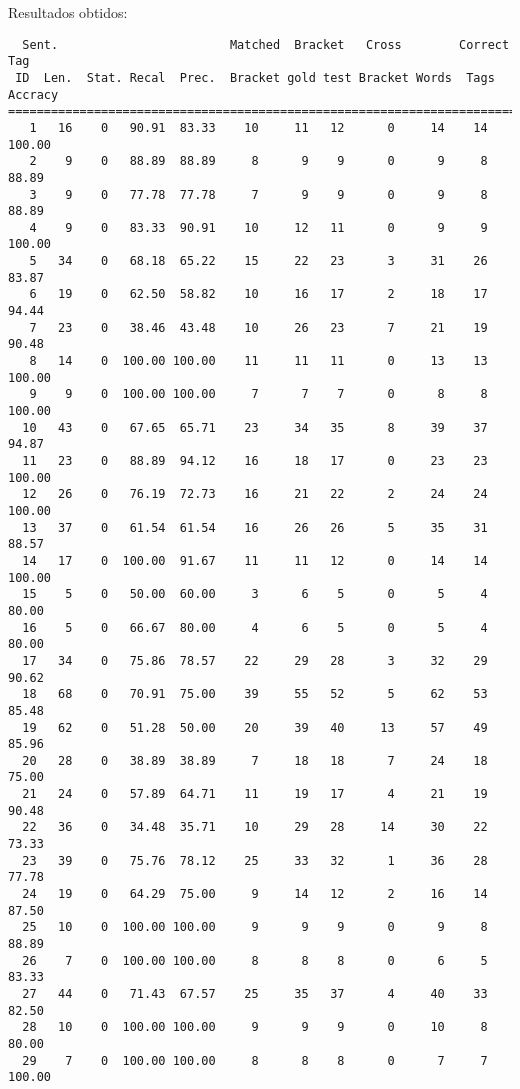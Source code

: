 \normalsize

Resultados obtidos:

\scriptsize
\begin{verbatim}
  Sent.                        Matched  Bracket   Cross        Correct Tag
 ID  Len.  Stat. Recal  Prec.  Bracket gold test Bracket Words  Tags Accracy
============================================================================
   1   16    0   90.91  83.33    10     11   12      0     14    14   100.00
   2    9    0   88.89  88.89     8      9    9      0      9     8    88.89
   3    9    0   77.78  77.78     7      9    9      0      9     8    88.89
   4    9    0   83.33  90.91    10     12   11      0      9     9   100.00
   5   34    0   68.18  65.22    15     22   23      3     31    26    83.87
   6   19    0   62.50  58.82    10     16   17      2     18    17    94.44
   7   23    0   38.46  43.48    10     26   23      7     21    19    90.48
   8   14    0  100.00 100.00    11     11   11      0     13    13   100.00
   9    9    0  100.00 100.00     7      7    7      0      8     8   100.00
  10   43    0   67.65  65.71    23     34   35      8     39    37    94.87
  11   23    0   88.89  94.12    16     18   17      0     23    23   100.00
  12   26    0   76.19  72.73    16     21   22      2     24    24   100.00
  13   37    0   61.54  61.54    16     26   26      5     35    31    88.57
  14   17    0  100.00  91.67    11     11   12      0     14    14   100.00
  15    5    0   50.00  60.00     3      6    5      0      5     4    80.00
  16    5    0   66.67  80.00     4      6    5      0      5     4    80.00
  17   34    0   75.86  78.57    22     29   28      3     32    29    90.62
  18   68    0   70.91  75.00    39     55   52      5     62    53    85.48
  19   62    0   51.28  50.00    20     39   40     13     57    49    85.96
  20   28    0   38.89  38.89     7     18   18      7     24    18    75.00
  21   24    0   57.89  64.71    11     19   17      4     21    19    90.48
  22   36    0   34.48  35.71    10     29   28     14     30    22    73.33
  23   39    0   75.76  78.12    25     33   32      1     36    28    77.78
  24   19    0   64.29  75.00     9     14   12      2     16    14    87.50
  25   10    0  100.00 100.00     9      9    9      0      9     8    88.89
  26    7    0  100.00 100.00     8      8    8      0      6     5    83.33
  27   44    0   71.43  67.57    25     35   37      4     40    33    82.50
  28   10    0  100.00 100.00     9      9    9      0     10     8    80.00
  29    7    0  100.00 100.00     8      8    8      0      7     7   100.00

\end{verbatim}
